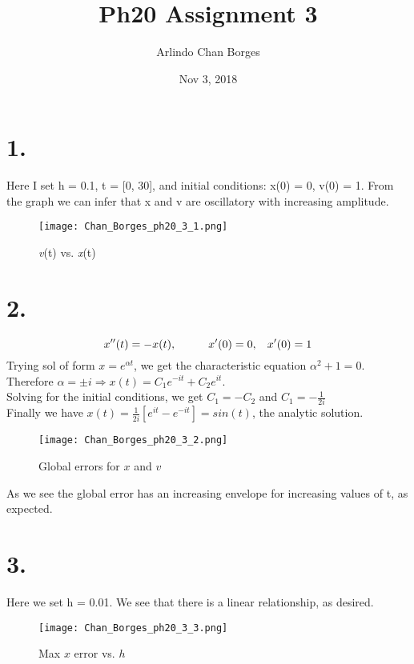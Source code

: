 \documentclass[12pt]{article}
\begin{document}
\title{Ph20 Assignment 3}
\author{Arlindo Chan Borges}
\date{Nov 3, 2018}
\maketitle
\section*{1.}
Here I set h = 0.1, t = [0, 30], and initial conditions: x(0) = 0, v(0) = 1.
From the graph we can infer that x and v are oscillatory with increasing amplitude.

\begin{figure}[h]
\texttt{[image: Chan\_Borges\_ph20\_3\_1.png]}
\caption{ \textit{v}(t) vs. \textit{x}(t)}
\end{figure}

\section*{2.}
\begin{equation} 
x''(t) = -x(t), \hspace{10mm} x'(0) = 0,  \hspace{3mm}x'(0) = 1
\end{equation}
Trying sol of form $x = \textit{e}^{\alpha t}$, we get the characteristic equation $\alpha^2 + 1 = 0$.
\\
Therefore $\alpha = \pm i \Longrightarrow x(t) = C_1 e^{-it} + C_2 e^{it}$.
\\
Solving for the initial conditions, we get $C_1 = -C_2$ and $C_1 = -\frac{1}{2i}$
\\
Finally we have  $x(t) = \frac{1}{2i} [e^{it} - e^{-it}] = sin(t) $, the analytic solution.

\begin{figure}[h]
\texttt{[image: Chan\_Borges\_ph20\_3\_2.png]}
\caption{Global errors for $x$ and $v$}
\end{figure}

\noindent As we see the global error has an increasing envelope for increasing values of t, as expected.

\newpage

\section*{3.}
Here we set h = 0.01. We see that there is a linear relationship, as desired.
\begin{figure}[h]
\texttt{[image: Chan\_Borges\_ph20\_3\_3.png]}
\centering
\caption{Max $x$ error vs. $h$}
\end{figure}
\end{document}
